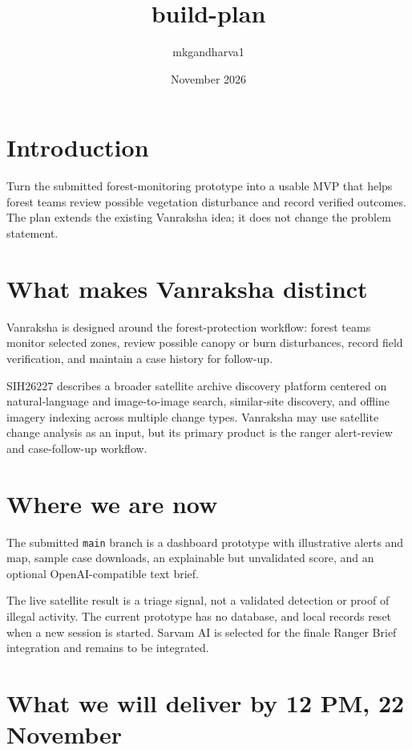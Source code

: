\documentclass{article}
\title{build-plan}
\author{mkgandharva1 }
\date{November 2026}
\begin{document}
\maketitle

\section{Introduction}

Turn the submitted forest-monitoring prototype into a usable MVP that helps forest teams review possible vegetation disturbance and record verified outcomes. The plan extends the existing Vanraksha idea; it does not change the problem statement.

\section{What makes Vanraksha distinct}

Vanraksha is designed around the forest-protection workflow: forest teams monitor selected zones, review possible canopy or burn disturbances, record field verification, and maintain a case history for follow-up.

SIH26227 describes a broader satellite archive discovery platform centered on natural-language and image-to-image search, similar-site discovery, and offline imagery indexing across multiple change types. Vanraksha may use satellite change analysis as an input, but its primary product is the ranger alert-review and case-follow-up workflow.

\section{Where we are now}

The submitted \texttt{main} branch is a dashboard prototype with illustrative alerts and map, sample case downloads, an explainable but unvalidated score, and an optional OpenAI-compatible text brief.

The live satellite result is a triage signal, not a validated detection or proof of illegal activity. The current prototype has no database, and local records reset when a new session is started. Sarvam AI is selected for the finale Ranger Brief integration and remains to be integrated.

\section{What we will deliver by 12 PM, 22 November}
\end{document}
